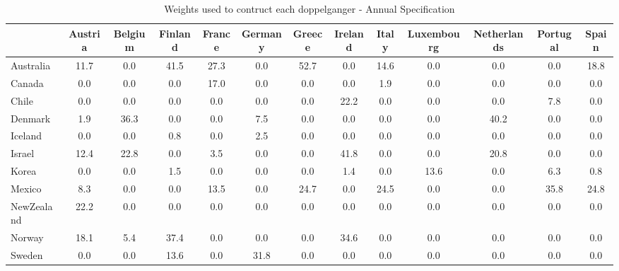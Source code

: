 \begin{table}[htbp]
\caption{\label{clabel} Weights used to contruct each doppelganger - Annual Specification}\centering\medskip
\begin{tabular}{lcccccccccccc} \hline \hline
 & Austria  & Belgium  & Finland  & France  & Germany  & Greece  & Ireland  & Italy  & Luxembourg  & Netherlands  & Portugal  & Spain  \\  \hline 
Australia &      11.7 &       0.0 &      41.5 &      27.3 &       0.0 &      52.7 &       0.0 &      14.6 &       0.0 &       0.0 &       0.0 &      18.8 \\  
Canada &       0.0 &       0.0 &       0.0 &      17.0 &       0.0 &       0.0 &       0.0 &       1.9 &       0.0 &       0.0 &       0.0 &       0.0 \\  
Chile &       0.0 &       0.0 &       0.0 &       0.0 &       0.0 &       0.0 &      22.2 &       0.0 &       0.0 &       0.0 &       7.8 &       0.0 \\  
Denmark &       1.9 &      36.3 &       0.0 &       0.0 &       7.5 &       0.0 &       0.0 &       0.0 &       0.0 &      40.2 &       0.0 &       0.0 \\  
Iceland &       0.0 &       0.0 &       0.8 &       0.0 &       2.5 &       0.0 &       0.0 &       0.0 &       0.0 &       0.0 &       0.0 &       0.0 \\  
Israel &      12.4 &      22.8 &       0.0 &       3.5 &       0.0 &       0.0 &      41.8 &       0.0 &       0.0 &      20.8 &       0.0 &       0.0 \\  
Korea &       0.0 &       0.0 &       1.5 &       0.0 &       0.0 &       0.0 &       1.4 &       0.0 &      13.6 &       0.0 &       6.3 &       0.8 \\  
Mexico &       8.3 &       0.0 &       0.0 &      13.5 &       0.0 &      24.7 &       0.0 &      24.5 &       0.0 &       0.0 &      35.8 &      24.8 \\  
NewZealand &      22.2 &       0.0 &       0.0 &       0.0 &       0.0 &       0.0 &       0.0 &       0.0 &       0.0 &       0.0 &       0.0 &       0.0 \\  
Norway &      18.1 &       5.4 &      37.4 &       0.0 &       0.0 &       0.0 &      34.6 &       0.0 &       0.0 &       0.0 &       0.0 &       0.0 \\  
Sweden &       0.0 &       0.0 &      13.6 &       0.0 &      31.8 &       0.0 &       0.0 &       0.0 &       0.0 &       0.0 &       0.0 &       0.0 \\  

\end{tabular}
\end{table}

